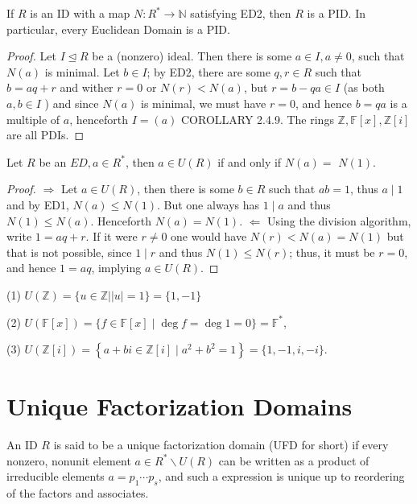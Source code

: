 \begin{proposition}
    If $R$ is an ID with a map $N: R^{*} \rightarrow \mathbb{N}$ satisfying ED2, then $R$ is a PID. In particular, every Euclidean Domain is a PID.
\end{proposition} 

\begin{proof}
    Let $I \unlhd R$ be a (nonzero) ideal. Then there is some $a \in I, a \neq 0$, such that $N(a)$ is minimal. Let $b \in I$; by ED2, there are some $q, r \in R$ such that $b=a q+r$ and wither $r=0$ or $N(r)<N(a)$, but $r=b-q a \in I$ (as both $a, b \in I$ ) and since $N(a)$ is minimal, we must have $r=0$, and hence $b=q a$ is a multiple of $a$, henceforth $I=(a)$ COROLLARY 2.4.9. The rings $\mathbb{Z}, \mathbb{F}[x], \mathbb{Z}[i]$ are all PDIs.
\end{proof} 

\begin{proposition}
    Let $R$ be an $E D, a \in R^{*}$, then $a \in U(R)$ if and only if $N(a)=$ $N(1)$.
\end{proposition} 

\begin{proof}
    $\Rightarrow$ Let $a \in U(R)$, then there is some $b \in R$ such that $a b=1$, thus $a \mid 1$ and by ED1, $N(a) \leq N(1)$. But one always has $1 \mid a$ and thus $N(1) \leq N(a)$. Henceforth $N(a)=N(1)$. $\Leftarrow$ Using the division algorithm, write $1=a q+r$. If it were $r \neq 0$ one would have $N(r)<N(a)=N(1)$ but that is not possible, since $1 \mid r$ and thus $N(1) \leq N(r)$; thus, it must be $r=0$, and hence $1=a q$, implying $a \in U(R)$.
\end{proof}

\begin{example}
    (1) $U(\mathbb{Z})=\{u \in \mathbb{Z}|| u \mid=1\}=\{1,-1\}$

    (2) $U(\mathbb{F}[x])=\{f \in \mathbb{F}[x] \mid \operatorname{deg} f=\operatorname{deg} 1=0\}=\mathbb{F}^{*}$,
    
    (3) $U(\mathbb{Z}[i])=\left\{a+b i \in \mathbb{Z}[i] \mid a^{2}+b^{2}=1\right\}=\{1,-1, i,-i\}$.
\end{example}

\section{Unique Factorization Domains}

\begin{definition}
    An ID $R$ is said to be a unique factorization domain (UFD for short) if every nonzero, nonunit element $a \in R^{*} \backslash U(R)$ can be written as a product of irreducible elements $a=p_{1} \cdots p_{s}$, and such a expression is unique up to reordering of the factors and associates.
\end{definition} 

